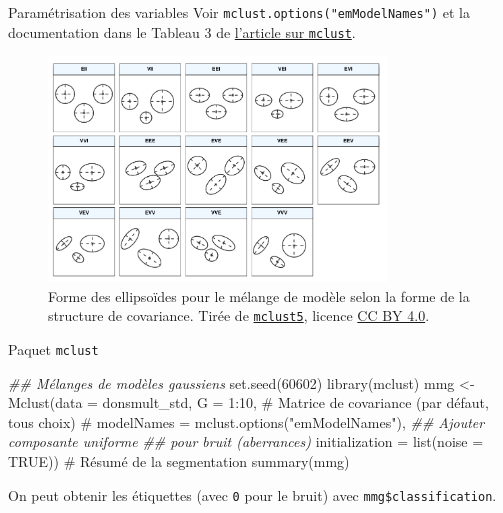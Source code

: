 \documentclass[
  ignorenonframetext,
]{beamer}
\newenvironment{Shaded}{\begin{snugshade}}{\end{snugshade}}
\newcommand{\AttributeTok}[1]{\textcolor[rgb]{0.40,0.45,0.13}{#1}}
\newcommand{\CommentTok}[1]{\textcolor[rgb]{0.37,0.37,0.37}{#1}}
\newcommand{\ConstantTok}[1]{\textcolor[rgb]{0.56,0.35,0.01}{#1}}
\newcommand{\DecValTok}[1]{\textcolor[rgb]{0.68,0.00,0.00}{#1}}
\newcommand{\DocumentationTok}[1]{\textcolor[rgb]{0.37,0.37,0.37}{\textit{#1}}}
\newcommand{\FunctionTok}[1]{\textcolor[rgb]{0.28,0.35,0.67}{#1}}
\newcommand{\NormalTok}[1]{\textcolor[rgb]{0.00,0.23,0.31}{#1}}
\newcommand{\OtherTok}[1]{\textcolor[rgb]{0.00,0.23,0.31}{#1}}
\newcommand{\SpecialCharTok}[1]{\textcolor[rgb]{0.37,0.37,0.37}{#1}}
\begin{document}
\begin{frame}[fragile]{Paramétrisation des variables}
\protect\hypertarget{paramuxe9trisation-des-variables}{}
Voir \texttt{mclust.options("emModelNames")} et la documentation dans le
Tableau 3 de
\href{https://journal.r-project.org/archive/2016/RJ-2016-021/RJ-2016-021.pdf}{l'article
sur \texttt{mclust}}.

\begin{figure}

{\centering \includegraphics[width=0.8\textwidth,height=\textheight]{figures/mclust5-parametrization.png}

}

\caption{\label{fig-modeles}Forme des ellipsoïdes pour le mélange de
modèle selon la forme de la structure de covariance. Tirée de
\href{(https://journal.r-project.org/archive/2016/RJ-2016-021/RJ-2016-021.pdf)}{\texttt{mclust5}},
licence \href{https://creativecommons.org/licenses/by/4.0/}{CC BY 4.0}.}

\end{figure}
\end{frame}

\begin{frame}[fragile]{Paquet \texttt{mclust}}
\protect\hypertarget{paquet-mclust}{}
\begin{Shaded}
\begin{Highlighting}[numbers=left,,]
\DocumentationTok{\#\# Mélanges de modèles gaussiens}
\FunctionTok{set.seed}\NormalTok{(}\DecValTok{60602}\NormalTok{)}
\FunctionTok{library}\NormalTok{(mclust)}
\NormalTok{mmg }\OtherTok{\textless{}{-}} \FunctionTok{Mclust}\NormalTok{(}\AttributeTok{data =}\NormalTok{ donsmult\_std,}
       \AttributeTok{G =} \DecValTok{1}\SpecialCharTok{:}\DecValTok{10}\NormalTok{,}
       \CommentTok{\# Matrice de covariance (par défaut, tous choix)}
       \CommentTok{\# modelNames = mclust.options("emModelNames"), }
       \DocumentationTok{\#\# Ajouter composante uniforme}
       \DocumentationTok{\#\#  pour bruit (aberrances)}
       \AttributeTok{initialization =} \FunctionTok{list}\NormalTok{(}\AttributeTok{noise =} \ConstantTok{TRUE}\NormalTok{))}
\CommentTok{\# Résumé de la segmentation}
\FunctionTok{summary}\NormalTok{(mmg)}
\end{Highlighting}
\end{Shaded}

On peut obtenir les étiquettes (avec \texttt{0} pour le bruit) avec
\texttt{mmg\$classification}.
\end{frame}
\end{document}
